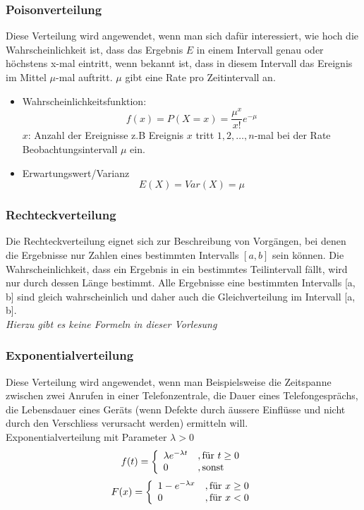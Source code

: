 \subsubsection{Poisonverteilung}
Diese Verteilung wird angewendet, wenn man sich dafür interessiert, wie hoch die Wahrscheinlichkeit ist, dass das Ergebnis $E$ in einem Intervall genau oder höchstens x-mal eintritt, wenn bekannt ist, dass in diesem Intervall das Ereignis im Mittel $\mu$-mal auftritt. $\mu$ gibt eine Rate pro Zeitintervall an.
\begin{itemize}
	\item Wahrscheinlichkeitsfunktion:
	\begin{equation}
	f(x) = P(X=x) = \frac{\mu^{x}}{x!} e^{-\mu}
	\end{equation}
	$x$: Anzahl der Ereignisse z.B Ereignis $x$ tritt $1, 2, \ldots, n$-mal bei der Rate Beobachtungsintervall $\mu$ ein. 
	\item Erwartungswert/Varianz
	\begin{equation}
	E(X) = Var(X)=\mu
	\end{equation}
\end{itemize}
\subsubsection{Rechteckverteilung}
Die Rechteckverteilung eignet sich zur Beschreibung von Vorgängen, bei denen die Ergebnisse nur Zahlen eines bestimmten Intervalls $[a, b]$ sein können. Die Wahrscheinlichkeit, dass ein Ergebnis in ein bestimmtes Teilintervall fällt, wird nur durch dessen Länge bestimmt. Alle Ergebnisse eine bestimmten Intervalls [a, b] sind gleich wahrscheinlich und daher auch die Gleichverteilung im Intervall [a, b].\\
\textit{Hierzu gibt es keine Formeln in dieser Vorlesung}
\subsubsection{Exponentialverteilung}
Diese Verteilung wird angewendet, wenn man Beispielsweise die Zeitspanne zwischen zwei Anrufen in einer Telefonzentrale, die Dauer eines Telefongesprächs, die Lebensdauer eines Geräts (wenn Defekte durch äussere Einflüsse und nicht durch den Verschliess verursacht werden) ermitteln will.\\
Exponentialverteilung mit Parameter $\lambda > 0$
\begin{equation}
f(t) = \left\{\begin{array}{l l} \lambda e^{-\lambda t}&, \mbox{für }t\geq 0\\ 0 &, \mbox{sonst}\end{array}\right.
\end{equation}
\begin{equation}
F(x) = \left\{\begin{array}{l l} 1-e^{-\lambda x}&,\mbox{für $x\geq 0$}\\ 0 &,\mbox{für }x < 0\end{array}\right.
\end{equation}
